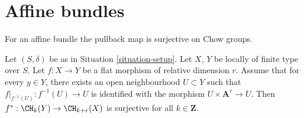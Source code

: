 \section{Affine bundles}
\label{section-affine-vector}

\noindent
For an affine bundle the pullback map is surjective on Chow groups.

\begin{lemma}
\label{lemma-pullback-affine-fibres-surjective}
Let $(S, \delta)$ be as in Situation \ref{situation-setup}.
Let $X$, $Y$ be locally of finite type over $S$.
Let $f : X \to Y$ be a flat morphism of relative dimension $r$.
Assume that for every $y \in Y$, there exists an open neighbourhood
$U \subset Y$ such that $f|_{f^{-1}(U)} : f^{-1}(U) \to U$
is identified with the morphism $U \times \mathbf{A}^r \to U$.
Then $f^* : \CH_k(Y) \to \CH_{k + r}(X)$ is surjective for all
$k \in \mathbf{Z}$.
\end{lemma}

